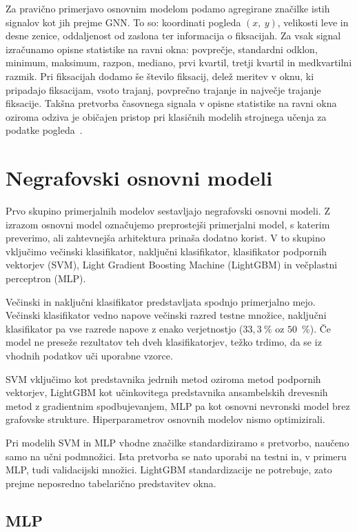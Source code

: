 Za pravično primerjavo osnovnim modelom podamo agregirane značilke istih signalov kot jih prejme GNN.
To so: koordinati pogleda $(x,~y)$, velikosti leve in desne zenice, oddaljenost od zaslona ter informacija o fiksacijah.
Za vsak signal izračunamo opisne statistike na ravni okna: povprečje, standardni odklon, minimum, maksimum, razpon, mediano, prvi kvartil, tretji kvartil in medkvartilni razmik.
Pri fiksacijah dodamo še število fiksacij, delež meritev v oknu, ki pripadajo fiksacijam, vsoto trajanj, povprečno trajanje in največje trajanje fiksacije.
Takšna pretvorba časovnega signala v opisne statistike na ravni okna oziroma odziva je običajen pristop pri klasičnih modelih strojnega učenja za podatke pogleda~\cite{bozak2024feature,lim2020emotion,tarnowski2020eye}.

\section{Negrafovski osnovni modeli}
\label{subsec:baseline-modeli}

Prvo skupino primerjalnih modelov sestavljajo negrafovski osnovni modeli.
Z izrazom osnovni model označujemo preprostejši primerjalni model, s katerim preverimo, ali zahtevnejša arhitektura prinaša dodatno korist.
V to skupino vključimo večinski klasifikator, naključni klasifikator, klasifikator podpornih vektorjev (SVM), Light Gradient Boosting Machine (LightGBM) in večplastni perceptron (MLP).

Večinski in naključni klasifikator predstavljata spodnjo primerjalno mejo.
Večinski klasifikator vedno napove večinski razred testne množice, naključni klasifikator pa vse razrede napove z enako verjetnostjo ($33,3~\%$ oz $50$~\%).
Če model ne preseže rezultatov teh dveh klasifikatorjev, težko trdimo, da se iz vhodnih podatkov uči uporabne vzorce.

SVM vključimo kot predstavnika jedrnih metod oziroma metod podpornih vektorjev, LightGBM kot učinkovitega predstavnika ansambelskih drevesnih metod z gradientnim spodbujevanjem, MLP pa kot osnovni nevronski model brez grafovske strukture.
Hiperparametrov osnovnih modelov nismo optimizirali.

Pri modelih SVM in MLP vhodne značilke standardiziramo s pretvorbo, naučeno samo na učni podmnožici.
Ista pretvorba se nato uporabi na testni in, v primeru MLP, tudi validacijski množici.
LightGBM standardizacije ne potrebuje, zato prejme neposredno tabelarično predstavitev okna.

\subsection{MLP}


